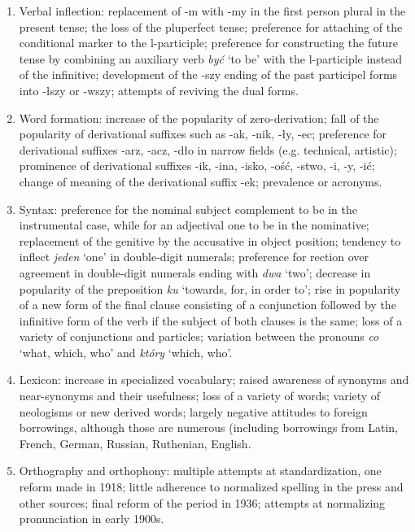\begin{enumerate}
    \item Verbal inflection: replacement of -m with -my in the first person plural in the present tense; the loss of the pluperfect tense; preference for attaching of the conditional marker to the l-participle; preference for constructing the future tense by combining an auxiliary verb \textit{być} `to be' with the l-participle instead of the infinitive; development of the -szy ending of the past participel forms into -łszy or -wszy; attempts of reviving the dual forms.
    
    \item Word formation: increase of the popularity of zero-derivation; fall of the popularity of derivational suffixes such as -ak, -nik, -ły, -ec; preference for derivational suffixes -arz, -acz, -dło in narrow fields (e.g. technical, artistic); prominence of derivational suffixes -ik, -ina, -isko, -ość, -stwo, -i, -y, -ić; change of meaning of the derivational suffix -ek; prevalence or acronyms.

    \item Syntax: preference for the nominal subject complement to be in the instrumental case, while for an adjectival one to be in the nominative; replacement of the genitive by the accusative in object position; tendency to inflect \textit{jeden} `one' in double-digit numerals; preference for rection over agreement in double-digit numerals ending with \textit{dwa} `two'; decrease in popularity of the preposition \textit{ku} `towards, for, in order to'; rise in popularity of a new form of the final clause consisting of a conjunction followed by the infinitive form of the verb if the subject of both clauses is the same; loss of a variety of conjunctions and particles; variation between the pronouns \textit{co} `what, which, who' and \textit{który} `which, who'. 

    \item Lexicon: increase in specialized vocabulary; raised awareness of synonyms and near-synonyms and their usefulness; loss of a variety of words; variety of neologisms or new derived words; largely negative attitudes to foreign borrowings, although those are numerous (including borrowings from Latin, French, German, Russian, Ruthenian, English.

    \item Orthography and orthophony: multiple attempts at standardization, one reform made in 1918; little adherence to normalized spelling in the press and other sources; final reform of the period in 1936; attempts at normalizing pronunciation in early 1900s.
\end{enumerate}

